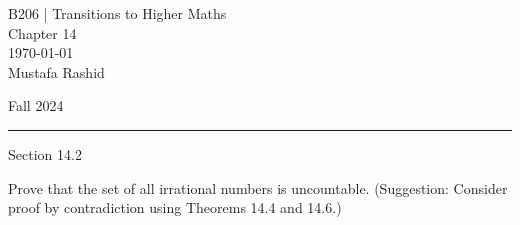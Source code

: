 \documentclass[12pt,letterpaper, onecolumn]{exam}
\begin{document}
	\begingroup  
	\noindent\LARGE B206 | Transitions to Higher Maths\\
	\noindent\LARGE Chapter 14\\
	\noindent\large \today\\
	\noindent\large Mustafa Rashid\par
	\noindent\large Fall 2024\par
	\endgroup
	\rule{\textwidth}{0.4pt}
	\pointsdroppedatright
	\printanswers
	\renewcommand{\solutiontitle}{\noindent\textbf{Ans:}\enspace}  
	\centerline{Section 14.2}
	\begin{questions}
		\setcounter{question}{3}\question Prove that the set of all irrational numbers is uncountable. (Suggestion: Consider proof by contradiction using Theorems 14.4 and 14.6.)
	\end{questions}	
\end{document}
